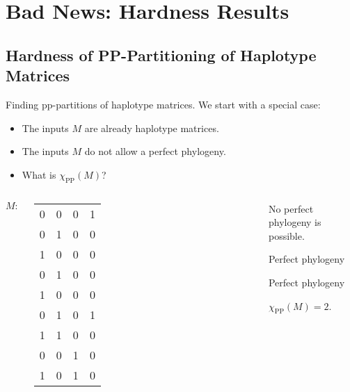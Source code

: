 \documentclass[aspectratio=169]{beamer}
\begin{document}
\section{Bad News: Hardness Results}

\subsection{Hardness of PP-Partitioning of Haplotype Matrices}

\begin{frame}{Finding pp-partitions of haplotype matrices.}
  We start with a special case:
  \begin{itemize}
  \item The inputs $M$ are \alert{already haplotype matrices}.
  \item The inputs $M$ \alert{do not allow a perfect phylogeny}.
  \item What is $\chi_{\operatorname{PP}}(M)$?
  \end{itemize}
  \begin{example}
    \begin{columns}
      $M\colon$
      \footnotesize
      \begin{tabular}{cccc}
        0 & 0 & 0 & 1 \\
        0 & 1 & 0 & 0 \\
        1 & 0 & 0 & 0 \\
        0 & 1 & 0 & 0 \\
        1 & 0 & 0 & 0 \\
        0 & 1 & 0 & 1 \\
        1 & 1 & 0 & 0 \\
        0 & 0 & 1 & 0 \\
        1 & 0 & 1 & 0
      \end{tabular}%
      {%
      }
      \begin{overprint}
        No perfect phylogeny is possible.
        
        \textcolor{blue!70!bg}{Perfect phylogeny}
        
        \textcolor{red!70!bg}{Perfect phylogeny}
        
        $\chi_{\operatorname{PP}}(M) = 2$.
        
      \end{overprint}
    \end{columns}
  \end{example}
\end{frame}
\end{document}
